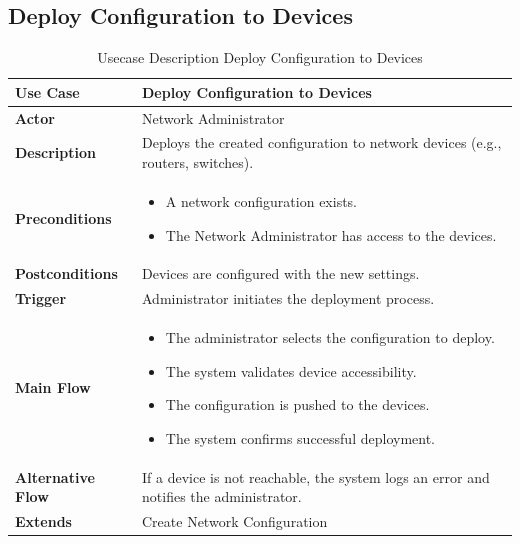 \subsection{Deploy Configuration to Devices}


\begin{table}[H]
    \centering
    \caption{Usecase Description Deploy Configuration to Devices}
    \renewcommand{\arraystretch}{1.3}
    \begin{tabular}{|p{3cm}|p{11cm}|}
        \hline
        \textbf{Use Case} & \textbf{Deploy Configuration to Devices} \\
        \hline
        \textbf{Actor} & Network Administrator \\
        \hline
        \textbf{Description} & Deploys the created configuration to network devices (e.g., routers, switches). \\
        \hline
        \textbf{Preconditions} & 
        \begin{itemize}
            \item A network configuration exists.
            \item The Network Administrator has access to the devices.
        \end{itemize} \\
        \hline
        \textbf{Postconditions} & Devices are configured with the new settings. \\
        \hline
        \textbf{Trigger} & Administrator initiates the deployment process. \\
        \hline
        \textbf{Main Flow} & 
        \begin{itemize}
            \item The administrator selects the configuration to deploy.
            \item The system validates device accessibility.
            \item The configuration is pushed to the devices.
            \item The system confirms successful deployment.
        \end{itemize} \\
        \hline
        \textbf{Alternative Flow} & If a device is not reachable, the system logs an error and notifies the administrator. \\
        \hline
        \textbf{Extends} & Create Network Configuration \\
        \hline
    \end{tabular}
\end{table}

